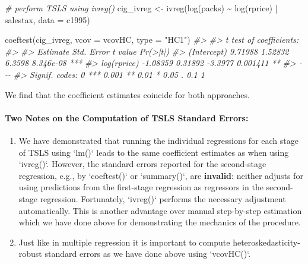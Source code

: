 \documentclass[
  14pt,
]{memoir}
\newenvironment{Shaded}{\begin{snugshade}}{\end{snugshade}}
\newcommand{\AttributeTok}[1]{\textcolor[rgb]{0.77,0.63,0.00}{#1}}
\newcommand{\CommentTok}[1]{\textcolor[rgb]{0.56,0.35,0.01}{\textit{#1}}}
\newcommand{\FunctionTok}[1]{\textcolor[rgb]{0.00,0.00,0.00}{#1}}
\newcommand{\NormalTok}[1]{#1}
\newcommand{\OtherTok}[1]{\textcolor[rgb]{0.56,0.35,0.01}{#1}}
\newcommand{\SpecialCharTok}[1]{\textcolor[rgb]{0.00,0.00,0.00}{#1}}
\newcommand{\StringTok}[1]{\textcolor[rgb]{0.31,0.60,0.02}{#1}}
\begin{document}
\begin{Shaded}
\begin{Highlighting}[]
\CommentTok{\# perform TSLS using \textquotesingle{}ivreg()\textquotesingle{}}
\NormalTok{cig\_ivreg }\OtherTok{\textless{}{-}} \FunctionTok{ivreg}\NormalTok{(}\FunctionTok{log}\NormalTok{(packs) }\SpecialCharTok{\textasciitilde{}} \FunctionTok{log}\NormalTok{(rprice) }\SpecialCharTok{|}\NormalTok{ salestax, }
                   \AttributeTok{data =}\NormalTok{ c1995)}

\FunctionTok{coeftest}\NormalTok{(cig\_ivreg, }\AttributeTok{vcov =}\NormalTok{ vcovHC, }\AttributeTok{type =} \StringTok{"HC1"}\NormalTok{)}
\CommentTok{\#\textgreater{} }
\CommentTok{\#\textgreater{} t test of coefficients:}
\CommentTok{\#\textgreater{} }
\CommentTok{\#\textgreater{}             Estimate Std. Error t value  Pr(\textgreater{}|t|)    }
\CommentTok{\#\textgreater{} (Intercept)  9.71988    1.52832  6.3598 8.346e{-}08 ***}
\CommentTok{\#\textgreater{} log(rprice) {-}1.08359    0.31892 {-}3.3977  0.001411 ** }
\CommentTok{\#\textgreater{} {-}{-}{-}}
\CommentTok{\#\textgreater{} Signif. codes:  0 \textquotesingle{}***\textquotesingle{} 0.001 \textquotesingle{}**\textquotesingle{} 0.01 \textquotesingle{}*\textquotesingle{} 0.05 \textquotesingle{}.\textquotesingle{} 0.1 \textquotesingle{} \textquotesingle{} 1}
\end{Highlighting}
\end{Shaded}

We find that the coefficient estimates coincide for both approaches.

\paragraph*{Two Notes on the Computation of TSLS Standard Errors:}
\begin{enumerate}
\item We have demonstrated that running the individual regressions for each stage of TSLS using `lm()` leads to the same coefficient estimates as when using `ivreg()`. However, the standard errors reported for the second-stage regression, e.g., by `coeftest()` or `summary()`, are \textbf{invalid}: neither adjusts for using predictions from the first-stage regression as regressors in the second-stage regression. Fortunately, `ivreg()` performs the necessary adjustment automatically. This is another advantage over manual step-by-step estimation which we have done above for demonstrating the mechanics of the procedure.
\item Just like in multiple regression it is important to compute heteroskedasticity-robust standard errors as we have done above using `vcovHC()`.
\end{enumerate}
\end{document}
